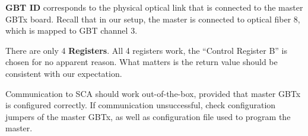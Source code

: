 \begin{leftbar}
    \textbf{GBT ID} corresponds to the physical optical link that is connected
    to the master GBTx board.
    Recall that in our setup, the master is connected to optical fiber 8, which
    is mapped to GBT channel 3.
\end{leftbar}

\begin{leftbar}
    There are only 4 \textbf{Registers}.
    All 4 registers work, the ``Control Register B'' is chosen for no apparent
    reason.
    What matters is the return value should be consistent with our expectation.
\end{leftbar}

\begin{leftbar}
    Communication to SCA should work out-of-the-box, provided that master GBTx
    is configured correctly.
    If communication unsuccessful, check configuration jumpers of the master
    GBTx, as well as configuration file used to program the master.
\end{leftbar}
